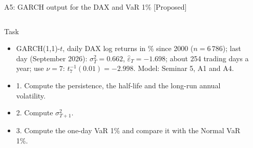 \begin{frame}{A5: GARCH output for the DAX and VaR 1\% [Proposed]}
\propsub
\itemsize{\scriptsize}
\begin{columns}[T]
\begin{column}{\taskw}
\begin{block}{Task}
\begin{center}
\scriptsize
{}
\end{center}
\begin{itemize}
    \item GARCH(1,1)-$t$, daily DAX log returns in \% since 2000 ($n = 6\,786$); last day (September 2026): $\sigma_T^2 = 0.662$, $\hat\varepsilon_T = \ensuremath{-}1.698$; about 254 trading days a year; use $\nu = 7$: $t_{7}^{-1}(0.01) = \ensuremath{-}2.998$. Model: Seminar 5, A1 and A4.
    \item 1. Compute the persistence, the half-life and the long-run annual volatility.
    \item 2. Compute $\sigma_{T+1}^2$.
    \item 3. Compute the one-day VaR 1\% and compare it with the Normal VaR 1\%.
\end{itemize}
\end{block}
\end{column}
\begin{column}{\solw}
\end{column}
\end{columns}
\end{frame}


